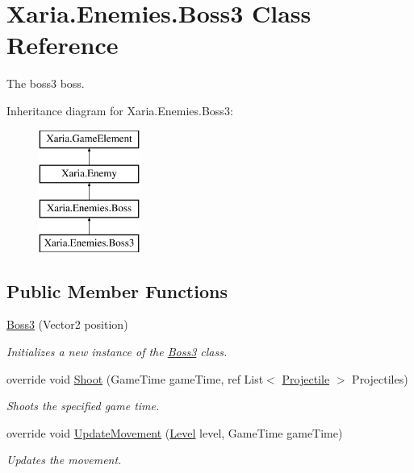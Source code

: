 \hypertarget{classXaria_1_1Enemies_1_1Boss3}{}\section{Xaria.\+Enemies.\+Boss3 Class Reference}
\label{classXaria_1_1Enemies_1_1Boss3}


The boss3 boss.  


Inheritance diagram for Xaria.\+Enemies.\+Boss3\+:\begin{figure}[H]
\begin{center}
\leavevmode
\includegraphics[height=4.000000cm]{classXaria_1_1Enemies_1_1Boss3}
\end{center}
\end{figure}
\subsection*{Public Member Functions}
\begin{DoxyCompactItemize}
\item 
\hyperlink{classXaria_1_1Enemies_1_1Boss3_ab3df4922a9d053c102ebcd31dded6b87}{Boss3} (Vector2 position)
\begin{DoxyCompactList}\small\item\em Initializes a new instance of the \hyperlink{classXaria_1_1Enemies_1_1Boss3}{Boss3} class. \end{DoxyCompactList}\item 
override void \hyperlink{classXaria_1_1Enemies_1_1Boss3_a5dfe4d674dc5bf5b39b0625ed89b1eb5}{Shoot} (Game\+Time game\+Time, ref List$<$ \hyperlink{classXaria_1_1Projectile}{Projectile} $>$ Projectiles)
\begin{DoxyCompactList}\small\item\em Shoots the specified game time. \end{DoxyCompactList}\item 
override void \hyperlink{classXaria_1_1Enemies_1_1Boss3_a60ae20b9df383474b5a59b0339773612}{Update\+Movement} (\hyperlink{classXaria_1_1Level}{Level} level, Game\+Time game\+Time)
\begin{DoxyCompactList}\small\item\em Updates the movement. \end{DoxyCompactList}\end{DoxyCompactItemize}
